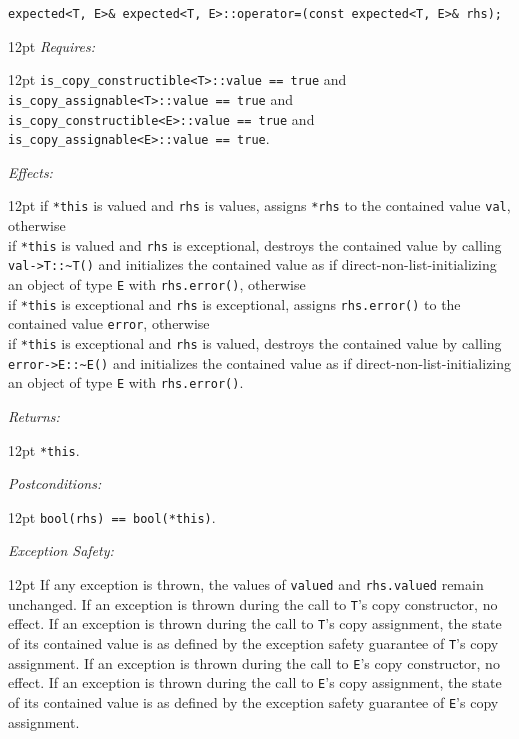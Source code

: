 \documentclass[a4paper,10pt]{article}
\newcommand{\cpp}[1]{\lstinline{#1}}
\newcommand{\wordingItem}[1]{\noindent\textit{#1:}}
\newenvironment{wordingTextItem}[1]{\wordingItem{#1}\vspace{7pt}\noindent\begin{adjustwidth}{12pt}{}}{\vspace{7pt}\end{adjustwidth}}
\newenvironment{wordingPara}{\begin{adjustwidth}{12pt}{}}{\end{adjustwidth}}
\begin{document}
\begin{lstlisting}[xleftmargin=0pt]
expected<T, E>& expected<T, E>::operator=(const expected<T, E>& rhs); 
\end{lstlisting}
\begin{wordingPara}
\begin{wordingTextItem}{Requires}
\cpp{is_copy_constructible<T>::value == true} and\\
\cpp{is_copy_assignable<T>::value == true} and\\
\cpp{is_copy_constructible<E>::value == true} and\\
\cpp{is_copy_assignable<E>::value == true}.
\end{wordingTextItem}
\begin{wordingTextItem}{Effects}
if \cpp{*this} is valued and \cpp{rhs} is values, assigns \cpp{*rhs} to the contained value \cpp{val}, otherwise \\
if \cpp{*this} is valued and \cpp{rhs} is exceptional, destroys the contained value by calling \cpp{val->T::~T()} and  initializes the contained value as if direct-non-list-initializing an object of type \cpp{E} with \cpp{rhs.error()}, otherwise \\
if \cpp{*this} is exceptional and \cpp{rhs} is exceptional, assigns \cpp{rhs.error()} to the contained value \cpp{error}, otherwise \\
if \cpp{*this} is exceptional and \cpp{rhs} is valued, destroys the contained value by calling \cpp{error->E::~E()} and  initializes the contained value as if direct-non-list-initializing an object of type \cpp{E} with \cpp{rhs.error()}.
\end{wordingTextItem}
\begin{wordingTextItem}{Returns}
\cpp{*this}.
\end{wordingTextItem}
\begin{wordingTextItem}{Postconditions}
\cpp{bool(rhs) == bool(*this)}.
\end{wordingTextItem}
\begin{wordingTextItem}{Exception Safety}
If any exception is thrown, the values of \cpp{valued} and \cpp{rhs.valued} remain unchanged. If an exception is thrown during the call to \cpp{T}'s copy constructor, no effect. If an exception is thrown during the call to \cpp{T}'s copy assignment, the state of its contained value is as defined by the exception safety guarantee of \cpp{T}'s copy assignment. If an exception is thrown during the call to \cpp{E}'s copy constructor, no effect. If an exception is thrown during the call to \cpp{E}'s copy assignment, the state of its contained value is as defined by the exception safety guarantee of \cpp{E}'s copy assignment.
\end{wordingTextItem}
\end{wordingPara}
\end{document}
